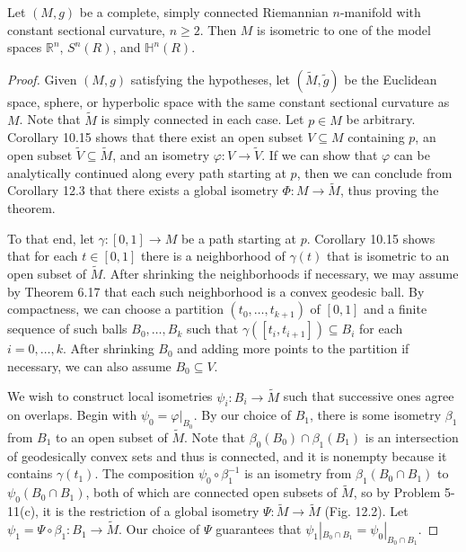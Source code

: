 \begin{theorem}
\label{thm:killing-hopf}

Let $(M,g)$ be a complete, simply connected Riemannian $n$-manifold with constant sectional curvature, $n \geq 2$. Then $M$ is isometric to one of the model spaces $\mathbb{R}^n$, $S^n(R)$, and $\mathbb{H}^n(R)$.

\begin{proof}
Given $(M,g)$ satisfying the hypotheses, let $(\tilde{M}, \tilde{g})$ be the Euclidean space, sphere, or hyperbolic space with the same constant sectional curvature as $M$. Note that $\tilde{M}$ is simply connected in each case. Let $p \in M$ be arbitrary. Corollary 10.15 shows that there exist an open subset $V \subseteq M$ containing $p$, an open subset $\tilde{V} \subseteq \tilde{M}$, and an isometry $\varphi : V \to \tilde{V}$. If we can show that $\varphi$ can be analytically continued along every path starting at $p$, then we can conclude from Corollary 12.3 that there exists a global isometry $\Phi : M \to \tilde{M}$, thus proving the theorem.

To that end, let $\gamma : [0,1] \to M$ be a path starting at $p$. Corollary 10.15 shows that for each $t \in [0, 1]$ there is a neighborhood of $\gamma(t)$ that is isometric to an open subset of $\tilde{M}$. After shrinking the neighborhoods if necessary, we may assume by Theorem 6.17 that each such neighborhood is a convex geodesic ball. By compactness, we can choose a partition $(t_0, \ldots, t_{k+1})$ of $[0,1]$ and a finite sequence of such balls $B_0, \ldots, B_k$ such that $\gamma([t_i, t_{i+1}]) \subseteq B_i$ for each $i = 0, \ldots, k$. After shrinking $B_0$ and adding more points to the partition if necessary, we can also assume $B_0 \subseteq V$.

We wish to construct local isometries $\psi_i : B_i \to \tilde{M}$ such that successive ones agree on overlaps. Begin with $\psi_0 = \varphi|_{B_0}$. By our choice of $B_1$, there is some isometry $\beta_1$ from $B_1$ to an open subset of $\tilde{M}$. Note that $\beta_0(B_0) \cap \beta_1(B_1)$ is an intersection of geodesically convex sets and thus is connected, and it is nonempty because it contains $\gamma(t_1)$. The composition $\psi_0 \circ \beta_1^{-1}$ is an isometry from $\beta_1(B_0 \cap B_1)$ to $\psi_0(B_0 \cap B_1)$, both of which are connected open subsets of $\tilde{M}$, so by Problem 5-11(c), it is the restriction of a global isometry $\Psi : \tilde{M} \to \tilde{M}$ (Fig. 12.2). Let $\psi_1 = \Psi \circ \beta_1 : B_1 \to \tilde{M}$. Our choice of $\Psi$ guarantees that $\psi_1|_{B_0 \cap B_1} = \psi_0|_{B_0 \cap B_1}$.


\end{proof}
\end{theorem}
